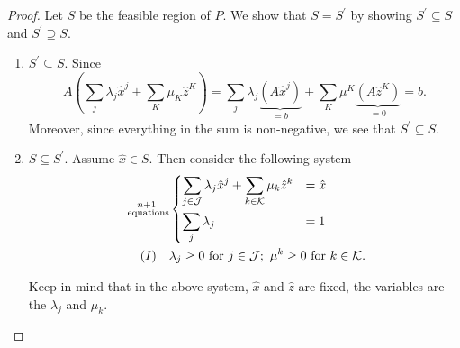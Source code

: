 \begin{proof}
	Let \(S\) be the feasible region of \(P\). We show that \(S = S^\prime\) by showing \(S^\prime\subseteq S\) and \(S^\prime\supseteq S\).
	\begin{enumerate}
		\item \(S^\prime\subseteq S\). Since
		      \[
			      A\left(\sum\limits_{j}\lambda_{j}\hat{x}^j + \sum\limits_{K}\mu_K \hat{z}^K \right)= \sum\limits_j \lambda_{j}\underbrace{\left(A \hat{x}^j\right)}_{=b}+\sum\limits_{K} \mu^K \underbrace{\left(A \hat{z}^K\right)}_{=0} = b.
		      \]
		      Moreover, since everything in the sum is non-negative, we see that \(S^\prime\subseteq S\).
		\item \(S\subseteq S^\prime\). Assume \(\hat{x}\in S\). Then consider the following system
		      \[
			      \begin{split}
				      \substack{n+1\\ \text{ equations}}&\begin{dcases}
					      \sum\limits_{j\in\mathcal{J}} \lambda_{j}\hat{x}^j + \sum\limits_{k\in\mathcal{K} } \mu_k \hat{z}^k & = \hat{x} \\
					      \sum\limits_{j}\lambda_{j}                                                                          & = 1       \\
				      \end{dcases}\\
				      (I)\quad&\lambda_{j}\geq 0 \text{ for }j\in\mathcal{J};\ \mu^k\geq 0 \text{ for }k\in\mathcal{K}.
			      \end{split}
		      \]
		      \begin{note}
			      Keep in mind that in the above system, \(\hat{x}\) and \(\hat{z}\) are fixed, the variables are the \(\lambda_{j}\) and \(\mu_k\).
		      \end{note}


\end{enumerate}
\end{proof}
